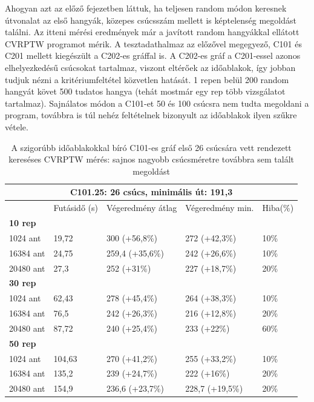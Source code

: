 Ahogyan azt az előző fejezetben láttuk, ha teljesen random módon keresnek útvonalat az első hangyák, közepes csúcsszám mellett is képtelenség megoldást találni. Az itteni mérési eredmények már a javított random hangyákkal ellátott CVRPTW programot mérik. A tesztadathalmaz az előzővel megegyező, C101 és C201 mellett kiegészült a C202-es gráffal is. A C202-es gráf a C201-essel azonos elhelyezkedésű csúcsokat tartalmaz, viszont eltérőek az időablakok, így jobban tudjuk nézni a kritériumfeltétel közvetlen hatását. 1 repen belül 200 random hangyát követ 500 tudatos hangya (tehát mostmár egy rep több vizsgálatot tartalmaz). Sajnálatos módon a C101-et 50 és 100 csúcsra nem tudta megoldani a program, továbbra is túl nehéz feltételnek bizonyult az időablakok ilyen szűkre vétele.

\begin{table}[ht!]
	\centering
	\begin{tabular}{|p{1.75cm}||p{2cm}|p{3.25cm}|p{3.25cm}|p{1.5cm}|}
		\hline
		\multicolumn{5}{|c|}{C101.25: 26 csúcs, minimális út: 191,3} \\
		\hline
		& Futásidő (s) & Végeredmény átlag & Végeredmény min. & Hiba(\%) \\
		\hline
		\textbf{10 rep} &  &  &  & \\
		1024 ant & 19,72 & 300 (+56,8\%) & 272 (+42,3\%) &  10\% \\
		16384 ant & 24,75 & 259,4 (+35,6\%) & 242 (+26,6\%) &  10\% \\
		20480 ant & 27,3 & 252 (+31\%) & 227 (+18,7\%) &  20\% \\
		\hline
		\textbf{30 rep} &  &  &  & \\
		1024 ant & 62,43 & 278 (+45,4\%) & 264 (+38,3\%) &  10\% \\
		16384 ant & 76,5 & 242 (+26,3\%) & 216 (+12,8\%) &  20\% \\
		20480 ant & 87,72 & 240 (+25,4\%) & 233 (+22\%) &  60\% \\
		\hline
		\textbf{50 rep} &  &  &  &  \\
		1024 ant & 104,63 & 270 (+41,2\%) & 255 (+33,2\%) &  10\% \\
		16384 ant & 135,2 & 239 (+24,7\%) & 222 (+16\%) &  20\% \\
		20480 ant & 154,9 & 236,6 (+23,7\%) & 228,7 (+19,5\%) &  20\% \\
		\hline
	\end{tabular}
	\caption{A szigorúbb időablakokkal bíró C101-es gráf első 26 csúcsára vett rendezett kereséses CVRPTW mérés: sajnos nagyobb csúcsméretre továbbra sem talált megoldást}
	\label{table:VRTPW2_25_1}
\end{table}

